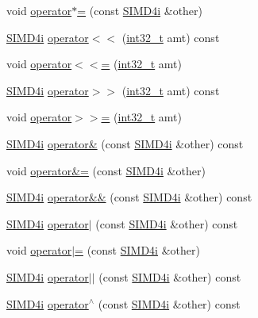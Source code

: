 \begin{DoxyCompactItemize}
\item 
void \hyperlink{class_s_i_m_d4i_a079177538e241a59bcacc67882ae17c1}{operator$\ast$=} (const \hyperlink{class_s_i_m_d4i}{S\+I\+M\+D4i} \&other)
\item 
\hyperlink{class_s_i_m_d4i}{S\+I\+M\+D4i} \hyperlink{class_s_i_m_d4i_a67394911ef17f4d16d53faef4e4ceec6}{operator$<$$<$} (\hyperlink{simddefines_8h_ab1967d8591af1a4e48c37fd2b0f184d0}{int32\+\_\+t} amt) const 
\item 
void \hyperlink{class_s_i_m_d4i_ab8f6b7585d6bf92ec33a539c79b7b7bc}{operator$<$$<$=} (\hyperlink{simddefines_8h_ab1967d8591af1a4e48c37fd2b0f184d0}{int32\+\_\+t} amt)
\item 
\hyperlink{class_s_i_m_d4i}{S\+I\+M\+D4i} \hyperlink{class_s_i_m_d4i_a0baf15484c035758227e81e6a374e6b8}{operator$>$$>$} (\hyperlink{simddefines_8h_ab1967d8591af1a4e48c37fd2b0f184d0}{int32\+\_\+t} amt) const 
\item 
void \hyperlink{class_s_i_m_d4i_a4fd5921769d1b8aa6190ad6a7bb9711c}{operator$>$$>$=} (\hyperlink{simddefines_8h_ab1967d8591af1a4e48c37fd2b0f184d0}{int32\+\_\+t} amt)
\item 
\hyperlink{class_s_i_m_d4i}{S\+I\+M\+D4i} \hyperlink{class_s_i_m_d4i_ae11927964ee93f1d7fdc70200f6c44af}{operator\&} (const \hyperlink{class_s_i_m_d4i}{S\+I\+M\+D4i} \&other) const 
\item 
void \hyperlink{class_s_i_m_d4i_ab043f1df60c0c27b01cbad213451d2f4}{operator\&=} (const \hyperlink{class_s_i_m_d4i}{S\+I\+M\+D4i} \&other)
\item 
\hyperlink{class_s_i_m_d4i}{S\+I\+M\+D4i} \hyperlink{class_s_i_m_d4i_a722f24539d12e24b2d7605777f0ef604}{operator\&\&} (const \hyperlink{class_s_i_m_d4i}{S\+I\+M\+D4i} \&other) const 
\item 
\hyperlink{class_s_i_m_d4i}{S\+I\+M\+D4i} \hyperlink{class_s_i_m_d4i_a103763b8ffc5eaf4ef9fb2a19fd3adab}{operator$\vert$} (const \hyperlink{class_s_i_m_d4i}{S\+I\+M\+D4i} \&other) const 
\item 
void \hyperlink{class_s_i_m_d4i_a9cd94e5583c62d123e7299d18f7a2f48}{operator$\vert$=} (const \hyperlink{class_s_i_m_d4i}{S\+I\+M\+D4i} \&other)
\item 
\hyperlink{class_s_i_m_d4i}{S\+I\+M\+D4i} \hyperlink{class_s_i_m_d4i_a9ac0052b953c317a29b736b4f3d4249d}{operator$\vert$$\vert$} (const \hyperlink{class_s_i_m_d4i}{S\+I\+M\+D4i} \&other) const 
\item 
\hyperlink{class_s_i_m_d4i}{S\+I\+M\+D4i} \hyperlink{class_s_i_m_d4i_a4abddc6f10ebb614d6ab0735671acbd8}{operator$^\wedge$} (const \hyperlink{class_s_i_m_d4i}{S\+I\+M\+D4i} \&other) const 

\end{DoxyCompactItemize}
